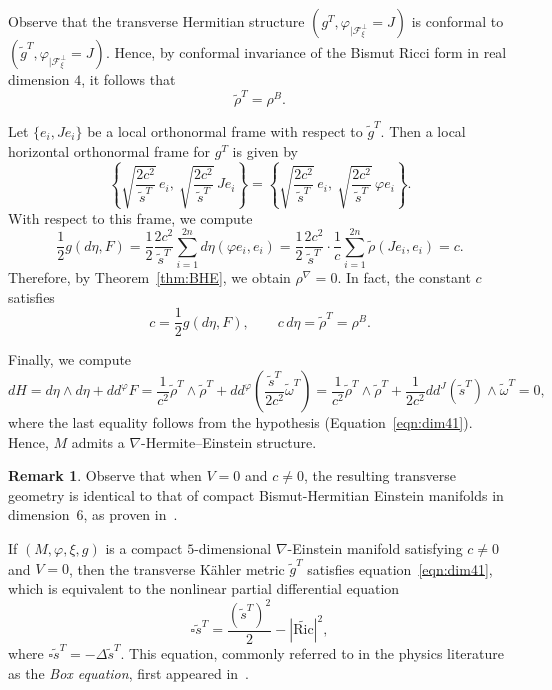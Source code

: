 \documentclass{article}
\makeatletter
\renewenvironment{proof}[1][\proofname]{%
  \par\pushQED{\qed}%
  \normalfont\topsep6\p@\@plus6\p@\relax
  \trivlist
  \item[\hskip\labelsep
        \textbf{\textup{#1}}\@addpunct{.}]\ignorespaces
}{%
  \popQED\endtrivlist\@endpefalse
}
\theoremstyle{definition}
\newtheorem{rmk}[thm]{Remark}
\renewcommand{\phi}{\varphi}
\numberwithin{equation}{section}
\makeatother
\begin{document}
\begin{proof}
Observe that the transverse Hermitian structure $(g^T, \phi_{|\mathcal{F}^\perp_\xi} = J)$ is conformal to $(\tilde g^T, \phi_{|\mathcal{F}^\perp_\xi} = J)$. Hence, by conformal invariance of the Bismut Ricci form in real dimension $4$, it follows that
\[
\tilde \rho^T = \rho^B.
\]

Let $\{e_i, J e_i\}$ be a local orthonormal frame with respect to $\tilde g^T$. Then a local horizontal orthonormal frame for $g^T$ is given by
\[
\left\{\sqrt{\frac{2c^2}{\tilde s^T}} \, e_i,\ \sqrt{\frac{2c^2}{\tilde s^T}} \, J e_i \right\}
=
\left\{\sqrt{\frac{2c^2}{\tilde s^T}} \, e_i,\ \sqrt{\frac{2c^2}{\tilde s^T}} \, \phi e_i \right\}.
\]
With respect to this frame, we compute
\[
\frac{1}{2} g(d\eta, F)
= \frac{1}{2} \frac{2c^2}{\tilde s^T} \sum_{i=1}^{2n} d\eta(\phi e_i, e_i)
= \frac{1}{2} \frac{2c^2}{\tilde s^T} \cdot \frac{1}{c} \sum_{i=1}^{2n} \tilde \rho(J e_i, e_i)
= c.
\]
Therefore, by Theorem~\ref{thm:BHE}, we obtain $\rho^\nabla = 0$. In fact, the constant $c$ satisfies
\[
c = \frac{1}{2} g(d\eta, F), \qquad c\, d\eta = \tilde \rho^T = \rho^B.
\]

Finally, we compute
\[
dH = d\eta \wedge d\eta + dd^\phi F
= \frac{1}{c^2} \tilde \rho^T \wedge \tilde \rho^T
+ dd^\phi \left(\frac{\tilde s^T}{2c^2} \tilde \omega^T \right)
= \frac{1}{c^2} \tilde \rho^T \wedge \tilde \rho^T
+ \frac{1}{2c^2} dd^J (\tilde s^T) \wedge \tilde \omega^T = 0,
\]
where the last equality follows from the hypothesis (Equation~\eqref{eqn:dim41}). Hence, $M$ admits a $\nabla$-Hermite--Einstein structure.


\end{proof}

\begin{rmk}
   Observe that when $V = 0$ and $c \neq 0$, the resulting transverse geometry is identical to that of compact Bismut-Hermitian Einstein manifolds in dimension~6, as proven in~\cite{ABLS}.

\end{rmk}
If $(M,\phi,\xi,g)$ is a compact $5$-dimensional $\nabla$-Einstein manifold satisfying $c \neq 0$ and $V = 0$, then the transverse K\"ahler metric $\tilde g^T$ satisfies equation~\eqref{eqn:dim41}, which is equivalent to the nonlinear partial differential equation
\begin{equation} \label{eqn:box}
\square \tilde s^T = \frac{(\tilde {s}^T)^{2}}{2} - |\tilde{\mathrm{Ric}}|^2,
\end{equation}
where $\square\tilde s^T = -\Delta \tilde s^T$. This equation, commonly referred to in the physics literature as the \emph{Box equation}, first appeared in~\cite{GK}.
\end{document}
